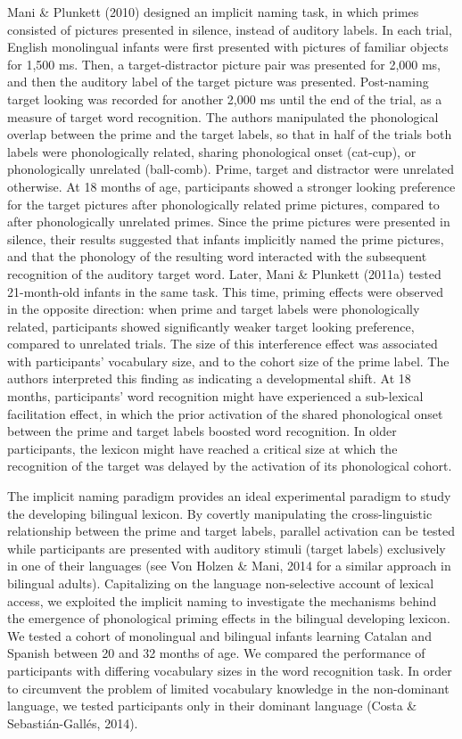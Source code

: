 \documentclass[
  12pt,
  b5paperpaper,
  twoside]{scrreprt}
\begin{document}
Mani \& Plunkett (2010) designed an implicit naming task, in which
primes consisted of pictures presented in silence, instead of auditory
labels. In each trial, English monolingual infants were first presented
with pictures of familiar objects for 1,500 ms. Then, a
target-distractor picture pair was presented for 2,000 ms, and then the
auditory label of the target picture was presented. Post-naming target
looking was recorded for another 2,000 ms until the end of the trial, as
a measure of target word recognition. The authors manipulated the
phonological overlap between the prime and the target labels, so that in
half of the trials both labels were phonologically related, sharing
phonological onset (cat-cup), or phonologically unrelated (ball-comb).
Prime, target and distractor were unrelated otherwise. At 18 months of
age, participants showed a stronger looking preference for the target
pictures after phonologically related prime pictures, compared to after
phonologically unrelated primes. Since the prime pictures were presented
in silence, their results suggested that infants implicitly named the
prime pictures, and that the phonology of the resulting word interacted
with the subsequent recognition of the auditory target word. Later, Mani
\& Plunkett (2011a) tested 21-month-old infants in the same task. This
time, priming effects were observed in the opposite direction: when
prime and target labels were phonologically related, participants showed
significantly weaker target looking preference, compared to unrelated
trials. The size of this interference effect was associated with
participants' vocabulary size, and to the cohort size of the prime
label. The authors interpreted this finding as indicating a
developmental shift. At 18 months, participants' word recognition might
have experienced a sub-lexical facilitation effect, in which the prior
activation of the shared phonological onset between the prime and target
labels boosted word recognition. In older participants, the lexicon
might have reached a critical size at which the recognition of the
target was delayed by the activation of its phonological cohort.

The implicit naming paradigm provides an ideal experimental paradigm to
study the developing bilingual lexicon. By covertly manipulating the
cross-linguistic relationship between the prime and target labels,
parallel activation can be tested while participants are presented with
auditory stimuli (target labels) exclusively in one of their languages
(see Von Holzen \& Mani, 2014 for a similar approach in bilingual
adults). Capitalizing on the language non-selective account of lexical
access, we exploited the implicit naming to investigate the mechanisms
behind the emergence of phonological priming effects in the bilingual
developing lexicon. We tested a cohort of monolingual and bilingual
infants learning Catalan and Spanish between 20 and 32 months of age. We
compared the performance of participants with differing vocabulary sizes
in the word recognition task. In order to circumvent the problem of
limited vocabulary knowledge in the non-dominant language, we tested
participants only in their dominant language (Costa \& Sebastián-Gallés,
2014).
\end{document}
